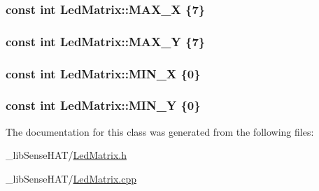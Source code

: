 \subsubsection[{\texorpdfstring{M\+A\+X\+\_\+X}{MAX_X}}]{\setlength{\rightskip}{0pt plus 5cm}const int Led\+Matrix\+::\+M\+A\+X\+\_\+X \{7\}\hspace{0.3cm}{\ttfamily [static]}}\hypertarget{class_led_matrix_a6da341535a246a5395b0a46569618830}{}\label{class_led_matrix_a6da341535a246a5395b0a46569618830}
\subsubsection[{\texorpdfstring{M\+A\+X\+\_\+Y}{MAX_Y}}]{\setlength{\rightskip}{0pt plus 5cm}const int Led\+Matrix\+::\+M\+A\+X\+\_\+Y \{7\}\hspace{0.3cm}{\ttfamily [static]}}\hypertarget{class_led_matrix_aa6cf03e172a1efe233aaac293be202bd}{}\label{class_led_matrix_aa6cf03e172a1efe233aaac293be202bd}
\subsubsection[{\texorpdfstring{M\+I\+N\+\_\+X}{MIN_X}}]{\setlength{\rightskip}{0pt plus 5cm}const int Led\+Matrix\+::\+M\+I\+N\+\_\+X \{0\}\hspace{0.3cm}{\ttfamily [static]}}\hypertarget{class_led_matrix_a30e3af90d4c9a83aec44e71914f86aa3}{}\label{class_led_matrix_a30e3af90d4c9a83aec44e71914f86aa3}
\subsubsection[{\texorpdfstring{M\+I\+N\+\_\+Y}{MIN_Y}}]{\setlength{\rightskip}{0pt plus 5cm}const int Led\+Matrix\+::\+M\+I\+N\+\_\+Y \{0\}\hspace{0.3cm}{\ttfamily [static]}}\hypertarget{class_led_matrix_a4bb052cfec297bc54387decb20a0f17f}{}\label{class_led_matrix_a4bb052cfec297bc54387decb20a0f17f}


The documentation for this class was generated from the following files\+:\begin{DoxyCompactItemize}
\item 
\+\_\+lib\+Sense\+H\+A\+T/\hyperlink{_led_matrix_8h}{Led\+Matrix.\+h}\item 
\+\_\+lib\+Sense\+H\+A\+T/\hyperlink{_led_matrix_8cpp}{Led\+Matrix.\+cpp}\end{DoxyCompactItemize}
